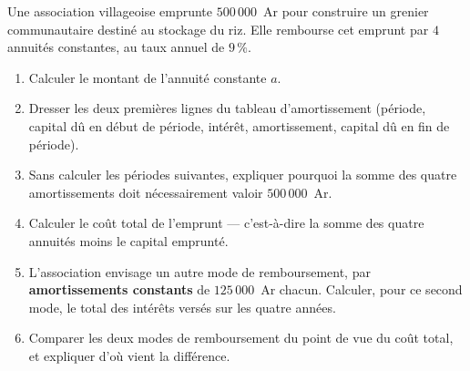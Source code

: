 \begin{jecherche}
Une association villageoise emprunte $500\,000$~Ar pour construire un
grenier communautaire destiné au stockage du riz. Elle rembourse cet emprunt
par $4$ annuités constantes, au taux annuel de $9\,\%$.

\begin{enumerate}[label=\textbf{\arabic*.}, leftmargin=*, itemsep=0.3em]
  \item Calculer le montant de l'annuité constante $a$.
  \item Dresser les deux premières lignes du tableau d'amortissement
        (période, capital dû en début de période, intérêt, amortissement,
        capital dû en fin de période).
  \item Sans calculer les périodes suivantes, expliquer pourquoi la somme
        des quatre amortissements doit nécessairement valoir $500\,000$~Ar.
  \item Calculer le coût total de l'emprunt — c'est-à-dire la somme des
        quatre annuités moins le capital emprunté.
  \item L'association envisage un autre mode de remboursement, par
        \textbf{amortissements constants} de $125\,000$~Ar chacun. Calculer,
        pour ce second mode, le total des intérêts versés sur les quatre
        années.
  \item Comparer les deux modes de remboursement du point de vue du coût
        total, et expliquer d'où vient la différence.
\end{enumerate}
\end{jecherche}


